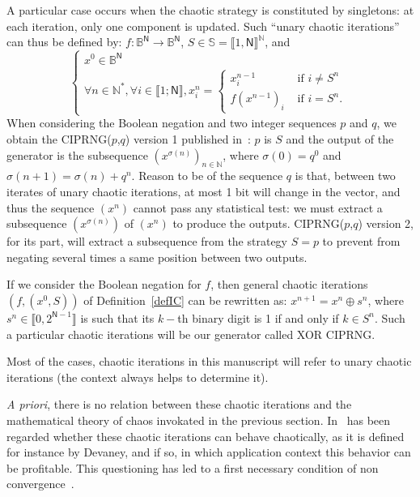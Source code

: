 \begin{example}
A particular case occurs when the chaotic strategy is constituted by singletons:
at each iteration, only one component is updated. Such ``unary chaotic iterations''
can thus be defined by:
$f: \mathds{B}^\mathsf{N} \longrightarrow \mathds{B}^\mathsf{N}$, 
$S \in \mathds{S}=\llbracket1,\mathsf{N}\rrbracket^\mathds{N}$, and
$$\left\{
\begin{array}{l}
x^0 \in \mathds{B}^\mathsf{N} \\
\forall n \in \mathds{N}^*, \forall i \in \llbracket 1; \mathsf{N} \rrbracket,  x^{n}_i = \left\{
\begin{array}{ll}
x^{n-1}_{i} & \textrm{ if } i \neq S^n\\
f(x^{n-1})_{i} & \textrm{ if } i = S^n.
\end{array}
\right.
\end{array}
\right.$$
When considering the Boolean negation and two integer sequences $p$ and $q$, we obtain the CIPRNG($p$,$q$) version 1 published in~\cite{wang2009}: $p$ is $S$ and the output of the generator
is the subsequence $\left(x^{\sigma(n)}\right)_{n\in\mathds{N}}$, where $\sigma(0)=q^0$ and
$\sigma(n+1) = \sigma(n)+q^n$. 
Reason to be of the sequence $q$ is that, between two iterates of unary chaotic
iterations, at most 1 bit will change in the vector, and thus the sequence
$(x^n)$ cannot pass any statistical test: we must extract a subsequence $(x^{\sigma(n)})$ of $(x^n)$
to produce the outputs.
 CIPRNG($p$,$q$) version 2, for its part, will extract
a subsequence from the strategy $S=p$ to prevent from negating several times a
same position between two outputs.
\end{example}

\begin{example}
If we consider the Boolean negation for $f$, then general chaotic iterations 
$(f, (x^0, S))$ of Definition~\ref{defIC} can be rewritten as: $x^{n+1} = x^n \oplus s^n$, where
$s^n \in \llbracket 0, 2^{\mathsf{N}-1}\rrbracket$ is such that
its $k-$th binary digit is 1 if and only if $k \in S^n$.
Such a particular chaotic iterations will be our generator called 
XOR CIPRNG.
\end{example}


\begin{remark}
Most of the cases, chaotic iterations in this manuscript will refer to unary chaotic iterations (the context always helps to determine it).
\end{remark}

\emph{A priori}, there is no relation between these chaotic iterations
and the mathematical theory of chaos invokated in the previous section.
In~\cite{GuyeuxThese10} has been regarded whether these chaotic iterations can 
behave chaotically, as it is defined for instance by Devaney, and if so, 
in which application context this behavior can be profitable.
This questioning has led to a first necessary condition of non convergence~\cite{GuyeuxThese10}.


